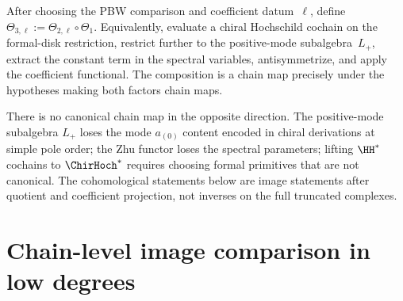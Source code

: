 \begin{construction}
\label{constr:theta3-chirhoch-to-GF}
After choosing the PBW comparison and coefficient datum~$\ell$, define
$\Theta_{3,\ell}:=\Theta_{2,\ell}\circ\Theta_1$. Equivalently,
evaluate a chiral Hochschild cochain on the formal-disk restriction,
restrict further to the positive-mode subalgebra~$L_+$, extract the
constant term in the spectral variables, antisymmetrize, and apply the
coefficient functional. The composition is a chain map precisely under
the hypotheses making both factors chain maps.
\end{construction}

\begin{remark}
\label{rem:no-chain-map-back}
There is no canonical chain map in the opposite direction. The
positive-mode subalgebra $L_+$ loses the mode $a_{(0)}$ content
encoded in chiral derivations at simple pole order; the Zhu
functor loses the spectral parameters; lifting $\HH^*$ cochains
to $\ChirHoch^*$ requires choosing formal primitives that are
not canonical. The cohomological statements below are image
statements after quotient and coefficient projection, not inverses on
the full truncated complexes.
\end{remark}

\section{Chain-level image comparison in low degrees}
\label{sec:chain-level-agreement-low}

